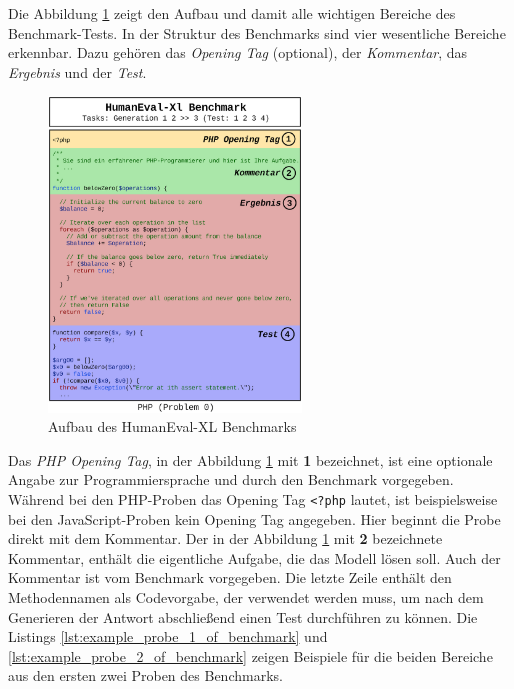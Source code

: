 Die Abbildung \ref{img:code_generation_humaneval} zeigt den Aufbau und damit alle wichtigen Bereiche des Benchmark-Tests. In der Struktur des Benchmarks sind vier wesentliche Bereiche erkennbar. Dazu gehören das \textit{Opening Tag} (optional), der \textit{Kommentar}, das \textit{Ergebnis} und der \textit{Test}.\vspace{0.2cm}

\begin{figure}[!ht]
	\includegraphics[width=0.6\textwidth]{content/chapter_concept_design/images/code_generation_humaneval_x.eps}
	\centering
	\caption{Aufbau des HumanEval-XL Benchmarks}
	\label{img:code_generation_humaneval}
\end{figure}

Das \textit{PHP Opening Tag}, in der Abbildung \ref{img:code_generation_humaneval} mit \textbf{1} bezeichnet, ist eine optionale Angabe zur Programmiersprache und durch den Benchmark vorgegeben. Während bei den PHP-Proben das Opening Tag \texttt{<?php} lautet, ist beispielsweise bei den JavaScript-Proben kein Opening Tag angegeben. Hier beginnt die Probe direkt mit dem Kommentar. Der in der Abbildung \ref{img:code_generation_humaneval} mit \textbf{2} bezeichnete Kommentar, enthält die eigentliche Aufgabe, die das Modell lösen soll. Auch der Kommentar ist vom Benchmark vorgegeben. Die letzte Zeile enthält den Methodennamen als Codevorgabe, der verwendet werden muss, um nach dem Generieren der Antwort abschließend einen Test durchführen zu können. Die Listings \ref{lst:example_probe_1_of_benchmark} und \ref{lst:example_probe_2_of_benchmark} zeigen Beispiele für die beiden Bereiche aus den ersten zwei Proben des Benchmarks.\vspace{0.2cm}

